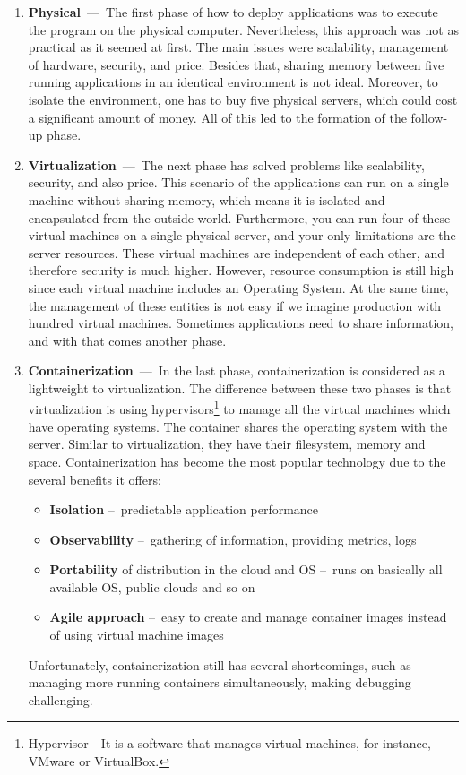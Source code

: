 \begin{enumerate}
    \item \textbf{Physical} \,---\, The first phase of how to deploy applications was to execute the program on the physical computer. Nevertheless, this approach was not as practical as it seemed at first. The main issues were scalability, management of hardware, security, and price. Besides that, sharing memory between five running applications in an identical environment is not ideal. Moreover, to isolate the environment, one has to buy five physical servers, which could cost a significant amount of money. All of this led to the formation of the follow-up phase.
    
    \item \textbf{Virtualization} \,---\, The next phase has solved problems like scalability, security, and also price. This scenario of the applications can run on a single machine without sharing memory, which means it is isolated and encapsulated from the outside world. Furthermore, you can run four of these virtual machines on a single physical server, and your only limitations are the server resources. These virtual machines are independent of each other, and therefore security is much higher. However, resource consumption is still high since each virtual machine includes an Operating System. At the same time, the management of these entities is not easy if we imagine production with hundred virtual machines. Sometimes applications need to share information, and with that comes another phase. 
    
    \item \textbf{Containerization} \,---\, In the last phase, containerization is considered as a lightweight to virtualization. The difference between these two phases is that virtualization is using hypervisors\footnote{Hypervisor - It is a software that manages virtual machines, for instance, VMware or VirtualBox.} to manage all the virtual machines which have operating systems. The container shares the operating system with the server. Similar to virtualization, they have their filesystem, memory and space. Containerization has become the most popular technology due to the several benefits it offers: 
        \begin{itemize}[itemsep=1mm, parsep=0pt]
            \item \textbf{Isolation} \---\ predictable application performance
            \item \textbf{Observability} \---\ gathering of information, providing metrics, logs
            \item \textbf{Portability} of distribution in the cloud and OS \---\ runs on basically all available OS, public clouds and so on
            \item \textbf{Agile approach} \---\ easy to create and manage container images instead of using virtual machine images
        \end{itemize}
    Unfortunately, containerization still has several shortcomings, such as managing more running containers simultaneously, making debugging challenging.
    

\end{enumerate}
